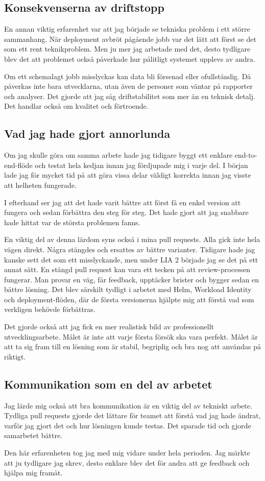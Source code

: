 \subsection*{Konsekvenserna av driftstopp}

En annan viktig erfarenhet var att jag började se tekniska problem i ett större sammanhang.
När deployment avbröt pågående jobb var det lätt att först se det som ett rent teknikproblem.
Men ju mer jag arbetade med det, desto tydligare blev det att problemet också påverkade hur
pålitligt systemet upplevs av andra.

Om ett schemalagt jobb misslyckas kan data bli försenad eller ofullständig. Då påverkas inte
bara utvecklarna, utan även de personer som väntar på rapporter och analyser. Det gjorde att
jag såg driftstabilitet som mer än en teknisk detalj. Det handlar också om kvalitet och
förtroende.

\subsection*{Vad jag hade gjort annorlunda}

Om jag skulle göra om samma arbete hade jag tidigare byggt ett enklare end-to-end-flöde och
testat hela kedjan innan jag fördjupade mig i varje del. I början lade jag för mycket tid på att
göra vissa delar väldigt korrekta innan jag visste att helheten fungerade.

I efterhand ser jag att det hade varit bättre att först få en enkel version att fungera och sedan
förbättra den steg för steg. Det hade gjort att jag snabbare hade hittat var de största problemen
fanns.

En viktig del av denna lärdom syns också i mina pull requests. Alla gick inte hela vägen direkt.
Några stängdes och ersattes av bättre varianter. Tidigare hade jag kanske sett det som ett
misslyckande, men under LIA 2 började jag se det på ett annat sätt. En stängd pull request kan
vara ett tecken på att review-processen fungerar. Man provar en väg, får feedback, upptäcker
brister och bygger sedan en bättre lösning. Det blev särskilt tydligt i arbetet med Helm,
Workload Identity och deployment-flöden, där de första versionerna hjälpte mig att förstå vad
som verkligen behövde förbättras.

Det gjorde också att jag fick en mer realistisk bild av professionellt utvecklingsarbete. Målet
är inte att varje första försök ska vara perfekt. Målet är att ta sig fram till en lösning som är
stabil, begriplig och bra nog att användas på riktigt.

\subsection*{Kommunikation som en del av arbetet}

Jag lärde mig också att bra kommunikation är en viktig del av tekniskt arbete. Tydliga pull
requests gjorde det lättare för teamet att förstå vad jag hade ändrat, varför jag gjort det och
hur lösningen kunde testas. Det sparade tid och gjorde samarbetet bättre.

Den här erfarenheten tog jag med mig vidare under hela perioden. Jag märkte att ju tydligare
jag skrev, desto enklare blev det för andra att ge feedback och hjälpa mig framåt.